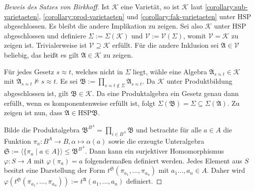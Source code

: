 \begin{proof}[Beweis des Satzes von Birkhoff]
    Ist $\mathcal{K}$ eine Varietät, so ist $\mathcal{K}$ laut \ref{corollary:sub-varietaeten}, \ref{corollary:prod-varietaeten} und
    \ref{corollary:fak-varietaeten} unter $\mathrm{HSP}$ abgeschlossen.
    Es bleibt die andere Implikation zu zeigen. Sei also $\mathcal{K}$ unter $\mathrm{HSP}$ abgeschlossen und definiere $\Sigma:=\Sigma(\mathcal{K})$ und $\mathcal{V}:=\mathcal{V}(\Sigma)$,
    womit $\mathcal{V}=\mathcal{K}$ zu zeigen ist. Trivialerweise ist $\mathcal{V}\supseteq\mathcal{K}$ erfüllt. Für die andere
    Inklusion sei $\mathfrak{A}\in\mathcal{V}$ beliebig, das heißt es gilt $\mathfrak{A}\in\mathcal{K}$ zu zeigen.

     Für jedes Gesetz $s\approx t$, welches nicht in $\Sigma$ liegt, wähle eine Algebra $\mathfrak{A}_{s\approx t}\in\mathcal{K}$ mit
    $\mathfrak{A}_{s\approx t}\not\models s\approx t$.
    Es sei $\mathfrak{B}:=\prod_{s\approx t\not\in\Sigma}\mathfrak{A}_{s\approx t}$. Da $\mathcal{K}$ unter Produktbildung abgeschlossen ist,
    gilt $\mathfrak{B}\in\mathcal{K}$. Da eine Produktalgebra ein Gesetz genau dann erfüllt, wenn es komponentenweise erfüllt ist,
    folgt $\Sigma(\mathfrak{B})=\Sigma\subseteq\Sigma(\mathfrak{A})$. Zu zeigen ist nun, dass $\mathfrak{A} \in \mathrm{HSP}\mathfrak{B}$.

    Bilde die Produktalgebra $\mathfrak{B}^{B^A}=\prod_{i\in B^A}\mathfrak{B}$ und betrachte für alle $a\in A$
    die Funktion $\pi_a:B^A\to B, \alpha\mapsto \alpha(a)$ sowie die erzeugte Unteralgebra $\mathfrak{S}:=\langle\{\pi_a\mid a\in A\}\rangle\le \mathfrak{B}^{B^A}$.
    Dann kann ein surjektiver Homomorphismus $\varphi:S\to A$ mit $\varphi(\pi_a)=a$ folgendermaßen definiert werden.
    Jedes Element aus $S$ besitzt eine Darstellung der Form $t^\mathfrak{S}(\pi_{a_1},\ldots,\pi_{a_n})$ mit $a_1\ldots,a_n\in A$.
    Daher wird $\varphi(t^\mathfrak{S}(\pi_{a_1},\ldots,\pi_{a_n})):=t^\mathfrak{A}(a_1,\ldots,a_n)$ definiert. 


\end{proof}
